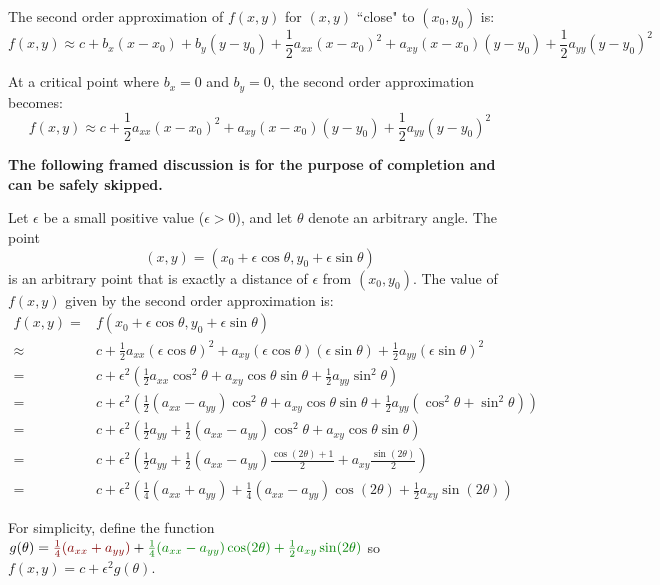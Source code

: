 \documentclass{article}
\newcommand{\dr}[1]{\textcolor{dark_red}{#1}}
\newcommand{\dg}[1]{\textcolor{dark_green}{#1}}
\begin{document}
The second order approximation of \(f(x,y)\) for \((x, y)\) ``close" to \((x_0, y_0)\) is:
\[f(x, y) \approx c + b_x(x - x_0) + b_y(y - y_0) + \frac{1}{2}a_{xx}(x - x_0)^2 + a_{xy}(x - x_0)(y - y_0) + \frac{1}{2}a_{yy}(y - y_0)^2\]

At a critical point where \(b_x = 0\) and \(b_y = 0\), the second order approximation becomes: 
\[f(x, y) \approx c + \frac{1}{2}a_{xx}(x - x_0)^2 + a_{xy}(x - x_0)(y - y_0) + \frac{1}{2}a_{yy}(y - y_0)^2\]

{\bf The following framed discussion is for the purpose of completion and can be safely skipped.}

\begin{framed}
Let \(\epsilon\) be a small positive value (\(\epsilon > 0\)), and let \(\theta\) denote an arbitrary angle. The point 
\[(x, y) = (x_0 + \epsilon \cos\theta, y_0 + \epsilon \sin\theta)\] 
is an arbitrary point that is exactly a distance of \(\epsilon\) from \((x_0, y_0)\). The value of \(f(x, y)\) given by the second order approximation is: 
\begin{align*}
f(x, y) = & f(x_0 + \epsilon \cos\theta, y_0 + \epsilon \sin\theta) \\
\approx & c + \frac{1}{2}a_{xx}(\epsilon \cos\theta)^2 + a_{xy}(\epsilon \cos\theta)(\epsilon \sin\theta) + \frac{1}{2}a_{yy}(\epsilon \sin\theta)^2 \\
= & c + \epsilon^2(\frac{1}{2}a_{xx}\cos^2\theta + a_{xy}\cos\theta\sin\theta + \frac{1}{2}a_{yy}\sin^2\theta) \\
= & c + \epsilon^2(\frac{1}{2}(a_{xx} - a_{yy})\cos^2\theta + a_{xy}\cos\theta\sin\theta + \frac{1}{2}a_{yy}(\cos^2\theta + \sin^2\theta)) \\
= & c + \epsilon^2(\frac{1}{2}a_{yy} + \frac{1}{2}(a_{xx} - a_{yy})\cos^2\theta + a_{xy}\cos\theta\sin\theta) \\ 
= & c + \epsilon^2(\frac{1}{2}a_{yy} + \frac{1}{2}(a_{xx} - a_{yy})\frac{\cos(2\theta) + 1}{2} + a_{xy}\frac{\sin(2\theta)}{2}) \\ 
= & c + \epsilon^2(\frac{1}{4}(a_{xx} + a_{yy}) + \frac{1}{4}(a_{xx} - a_{yy})\cos(2\theta) + \frac{1}{2}a_{xy}\sin(2\theta)) 
\end{align*}

For simplicity, define the function \(g(\theta) = \dr{\frac{1}{4}(a_{xx} + a_{yy})} + \dg{\frac{1}{4}(a_{xx} - a_{yy})\cos(2\theta) + \frac{1}{2}a_{xy}\sin(2\theta)}\) so \(f(x, y) = c + \epsilon^2 g(\theta)\).

\vspace{2mm}


\end{framed}
\end{document}
